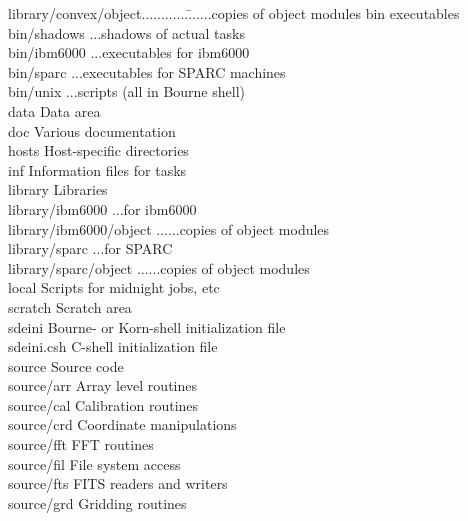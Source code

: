 \begin{tabbing}
library/convex/object............\=       ......copies of object modules\kill
bin\>                            executables\\
bin/shadows\>                        ...shadows of actual tasks\\
bin/ibm6000\>                        ...executables for ibm6000\\
bin/sparc\>                        ...executables for SPARC machines\\
bin/unix\>                        ...scripts (all in Bourne shell)\\
data\>                           Data area\\
doc\>                            Various documentation\\
hosts\>                          Host-specific directories\\
inf\>                            Information files for tasks\\
library\>                     Libraries\\
library/ibm6000\>                 ...for ibm6000\\
library/ibm6000/object\>          ......copies of object modules\\
library/sparc\>                 ...for SPARC\\
library/sparc/object\>          ......copies of object modules\\
local\>                          Scripts for midnight jobs, etc\\
scratch\>                        Scratch area\\
sdeini\>                         Bourne- or Korn-shell initialization file\\
sdeini.csh\>                      C-shell initialization file\\
source\>                         Source code\\
source/arr\>                     Array level routines\\
source/cal\>                     Calibration routines\\
source/crd\>                     Coordinate manipulations\\
source/fft\>                     FFT routines\\
source/fil\>                     File system access\\
source/fts\>                     FITS readers and writers\\
source/grd\>                     Gridding routines\\

\end{tabbing}
